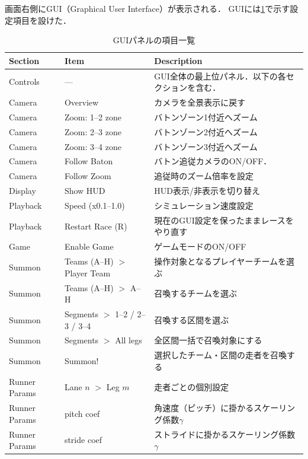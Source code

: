 \documentclass{jsai2e}
\begin{document}
画面右側にGUI（Graphical User Interface）が表示される．
GUIには\ref{tab:gui-items}で示す設定項目を設けた．


\begin{table}[t]
\footnotesize
\centering
\setlength{\tabcolsep}{3pt}
\renewcommand{\arraystretch}{1.08}
\caption{GUIパネルの項目一覧}
\label{tab:gui-items}
\begin{tabularx}{\columnwidth}{@{}p{}p{}X@{}}
\hline
\textbf{Section} & \textbf{Item} & \textbf{Description} \\
\hline
Controls & --- & GUI全体の最上位パネル．以下の各セクションを含む． \\
\hline
Camera & Overview & カメラを全景表示に戻す \\
Camera & Zoom: 1--2 zone & バトンゾーン1付近へズーム \\
Camera & Zoom: 2--3 zone & バトンゾーン2付近へズーム \\
Camera & Zoom: 3--4 zone & バトンゾーン3付近へズーム \\
Camera & Follow Baton & バトン追従カメラのON/OFF． \\
Camera & Follow Zoom & 追従時のズーム倍率を設定 \\
\hline
Display & Show HUD & HUD表示/非表示を切り替え \\
\hline
Playback & Speed (x0.1--1.0) & シミュレーション速度設定 \\
Playback & Restart Race (R) & 現在のGUI設定を保ったままレースをやり直す \\
\hline
Game & Enable Game & ゲームモードのON/OFF \\
\hline
Summon & Teams (A--H) $>$ Player Team & 操作対象となるプレイヤーチームを選ぶ\\
Summon & Teams (A--H) $>$ A--H & 召喚するチームを選ぶ\\
Summon & Segments $>$ 1--2 / 2--3 / 3--4 & 召喚する区間を選ぶ\\
Summon & Segments $>$ All legs & 全区間一括で召喚対象にする \\
Summon & Summon! & 選択したチーム・区間の走者を召喚する \\
\hline
Runner Params & Lane $n$ $>$ Leg $m$ & 走者ごとの個別設定 \\
Runner Params & pitch coef & 角速度（ピッチ）に掛かるスケーリング係数$\gamma$ \\
Runner Params & stride coef & ストライドに掛かるスケーリング係数$\gamma$\\

\end{tabularx}
\end{table}
\end{document}
